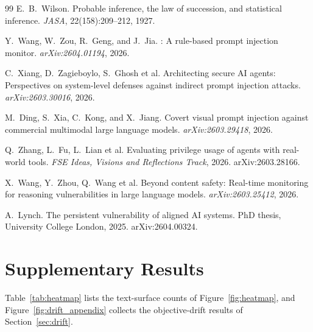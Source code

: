 \documentclass{article}
\begin{document}
\begin{thebibliography}{99}
E.~B.~Wilson.
\newblock Probable inference, the law of succession, and statistical
  inference.
\newblock \emph{JASA}, 22(158):209--212, 1927.

Y.~Wang, W.~Zou, R.~Geng, and J.~Jia.
: A rule-based prompt injection monitor.
\newblock \emph{arXiv:2604.01194}, 2026.

C.~Xiang, D.~Zagieboylo, S.~Ghosh et al.
\newblock Architecting secure {AI} agents: Perspectives on system-level
  defenses against indirect prompt injection attacks.
\newblock \emph{arXiv:2603.30016}, 2026.

M.~Ding, S.~Xia, C.~Kong, and X.~Jiang.
\newblock Covert visual prompt injection against commercial multimodal
  large language models.
\newblock \emph{arXiv:2603.29418}, 2026.

Q.~Zhang, L.~Fu, L.~Lian et al.
\newblock Evaluating privilege usage of agents with real-world tools.
\newblock \emph{FSE Ideas, Visions and Reflections Track}, 2026.
\newblock arXiv:2603.28166.

X.~Wang, Y.~Zhou, Q.~Wang et al.
\newblock Beyond content safety: Real-time monitoring for reasoning
  vulnerabilities in large language models.
\newblock \emph{arXiv:2603.25412}, 2026.

A.~Lynch.
\newblock The persistent vulnerability of aligned {AI} systems.
\newblock PhD thesis, University College London, 2025.
\newblock arXiv:2604.00324.

\end{thebibliography}

\clearpage
\onecolumn
\appendix
\renewcommand{\thefigure}{A\arabic{figure}}
\renewcommand{\thetable}{A\arabic{table}}
\setcounter{figure}{0}
\setcounter{table}{0}
\section{Supplementary Results}
\label{app:tables}
\label{app:drift}

Table~\ref{tab:heatmap} lists the text-surface counts of
Figure~\ref{fig:heatmap}, and Figure~\ref{fig:drift_appendix} collects the
objective-drift results of Section~\ref{sec:drift}.
\end{document}
